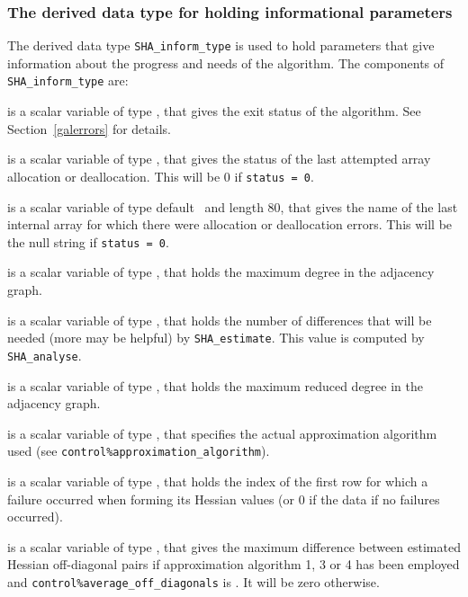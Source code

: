 \documentclass{galahad}
\newcommand{\packagename}{SHA}
\begin{document}

\subsubsection{The derived data type for holding informational
 parameters}\label{typeinform}
The derived data type
{\tt \packagename\_inform\_type}
is used to hold parameters that give information about the progress and needs
of the algorithm. The components of
{\tt \packagename\_inform\_type}
are:

\begin{description}
 is a scalar variable of type \integer, that gives the
exit status of the algorithm.
See Section~\ref{galerrors} for details.

 is a scalar variable of type \integer, that gives
the status of the last attempted array allocation or deallocation.
This will be 0 if {\tt status = 0}.

 is a scalar variable of type default \character\
and length 80, that  gives the name of the last internal array
for which there were allocation or deallocation errors.
This will be the null string if {\tt status = 0}.

 is a scalar variable of type \integer,
that holds the maximum degree in the adjacency graph.

 is a scalar variable of type \integer,
that holds the number of differences that will be needed (more may be helpful)
by {\tt \packagename\_\-estimate}. This value is computed by
{\tt \packagename\_\-analyse}.

 is a scalar variable of type \integer,
that holds the maximum reduced degree in the adjacency graph.

  is a scalar variable of type
\integer, that specifies the actual approximation algorithm used
(see {\tt control\%approximation\_algorithm}).

 is a scalar variable of type \integer, that holds the
index of the first row for which a failure occurred when forming its Hessian
values (or 0 if the data if no failures occurred).

 is a scalar variable of type \realdp, 
that gives the maximum difference between estimated Hessian off-diagonal 
pairs if approximation algorithm 1, 3 or 4 has been employed and
{\tt control\%average\_off\_diagonals} is \true. It will be zero otherwise.

\end{description}
\end{document}
